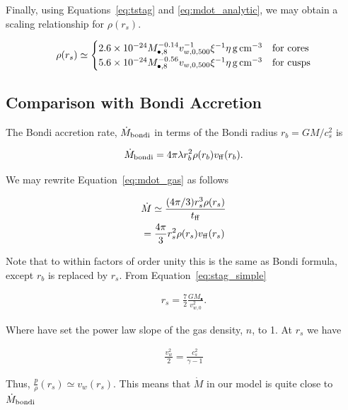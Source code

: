 \documentclass[usenatbib,fleqn]{mn2e}
\newcommand{\Mdotb}{\dot{M}_{\rm bondi}}
\newcommand{\rs}{r_s}
\newcommand{\rb}{r_b}
\newcommand{\vw}{v_w}
\newcommand{\kew}{\frac{v_w^2}{2}}
\newcommand{\cs}{\frac{p}{\rho}}
\newcommand{\Mbh}[1][]{M_{\bullet#1}}
\newcommand{\Mbheight}{M_{\bullet,8}}
\newcommand{\ff}{\rm ff}
\newcommand{\vwO}{v_{w,0}}
\newcommand{\vwOFH}{v_{w,0,500}}
\begin{document}
Finally, using Equations~\ref{eq:tstag} and \ref{eq:mdot_analytic}, we
may obtain a scaling relationship for $\rho(\rs)$. 

\begin{align}
  \rho(\rs)\simeq
  \begin{cases}
    2.6 \times 10^{-24} \Mbheight^{-0.14} \vwOFH^{-1} \xi^{-1} \eta \, {\rm g \, cm^{-3}}& \text{for cores}\\
    5.6 \times 10^{-24}  \Mbheight^{-0.56} \vwOFH  \xi^{-1}  \eta \, {\rm g \,cm^{-3}} & \text{for cusps}
  \end{cases}
  \label{eq:rhors}
\end{align}


\subsection{Comparison with Bondi Accretion}
The Bondi accretion rate, $\Mdotb$ in terms of the Bondi radius $\rb=G
M/c_s^2$ is 

\begin{align}
  \Mdotb=4\pi \lambda r_b^2 \rho(r_b) v_{\rm ff}(r_b).
\end{align}

We may rewrite Equation~\ref{eq:mdot_gas} as follows

\begin{align}
  &\dot{M}\simeq\frac{(4 \pi/3) \rs^3 \rho(\rs)}{t_{\ff}}\\
  &=\frac{4 \pi}{3} \rs^2 \rho(\rs) v_{\ff}(\rs)
\end{align}

Note that to within factors of order unity this is the same as Bondi formula, except $\rb$ is replaced by $\rs$. 
From Equation~\ref{eq:stag_simple}

\begin{align}
  \rs=\frac{7}{2}\frac{G \Mbh}{\vwO^2}.
  \label{eq:rs_simple}
\end{align}

Where have set the power law slope of the gas density, $n$, to 1.  At $\rs$ we have

\begin{align}
  \kew=\frac{c_s^2}{\gamma-1}
\end{align}

Thus, $\cs(\rs)\simeq \vw(\rs)$. This means that $\dot{M}$ in our model is quite close to $\Mdotb$


\end{document}
